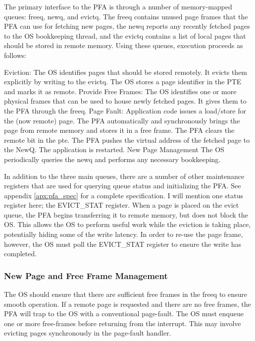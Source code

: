 The primary interface to the PFA is through a number of memory-mapped queues:
\gls{freeq}, \gls{newq}, and \gls{evictq}. The \gls{freeq} contains unused page frames that the PFA can
use for fetching new pages, the \gls{newq} reports any recently fetched pages to the
OS bookkeeping thread, and the \gls{evictq} contains a list of local pages that
should be stored in remote memory. Using these queues, execution proceeds as
follows:

\begin{outline}[enumerate]
  \1 Eviction:
      \2 The OS identifies pages that should be stored remotely.
      \2 It evicts them explicitly by writing to the \gls{evictq}.
      \2 The OS stores a page identifier in the PTE and marks it as remote.
  \1 Provide Free Frames:
      \2 The OS identifies one or more physical frames that can be used to
      house newly fetched pages.
      \2 It gives them to the PFA through the \gls{freeq}.
  \1 Page Fault:
      \2 Application code issues a load/store for the (now remote) page.
      \2 The PFA automatically and synchronously brings the page from remote
      memory and stores it in a free frame.
      \2 The PFA clears the remote bit in the pte.
      \2 The PFA pushes the virtual address of the fetched page to the NewQ.
      \2 The application is restarted.
  \1 New Page Management
      \2 The OS periodically queries the \gls{newq} and performs any
      necessary bookkeeping.
\end{outline}

In addition to the three main queues, there are a number of other maintenance
registers that are used for querying queue status and initializing the PFA. See
appendix \ref{apx:pfa_spec} for a complete specification. I will mention one status
register here; the EVICT\_STAT register. When a page is placed on the evict
queue, the PFA begins transferring it to remote memory, but does not block
the OS. This allows the OS to perform useful work while the eviction is taking
place, potentially hiding some of the write latency. In order to re-use the
page frame, however, the OS must poll the EVICT\_STAT register to ensure the
write has completed.

\subsubsection{New Page and Free Frame Management}
The OS should ensure that there are sufficient free frames in the \gls{freeq} to
ensure smooth operation. If a remote page is requested and there are no free
frames, the PFA will trap to the OS with a conventional page-fault. The OS must
enqueue one or more free-frames before returning from the interrupt. This may
involve evicting pages synchronously in the page-fault handler.

